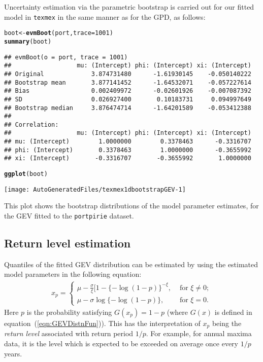 \documentclass[10pt]{article}\usepackage[]{graphicx}\usepackage[]{color}
\makeatletter
\def\maxwidth{ %
  \ifdim\Gin@nat@width>\linewidth
    \linewidth
  \else
    \Gin@nat@width
  \fi
}
\newcommand{\hlnum}[1]{\textcolor[rgb]{0.686,0.059,0.569}{#1}}%
\newcommand{\hlstd}[1]{\textcolor[rgb]{0.345,0.345,0.345}{#1}}%
\newcommand{\hlkwb}[1]{\textcolor[rgb]{0.69,0.353,0.396}{#1}}%
\newcommand{\hlkwc}[1]{\textcolor[rgb]{0.333,0.667,0.333}{#1}}%
\newcommand{\hlkwd}[1]{\textcolor[rgb]{0.737,0.353,0.396}{\textbf{#1}}}%
\newenvironment{kframe}{%
 \def\at@end@of@kframe{}%
 \ifinner\ifhmode%
  \def\at@end@of@kframe{\end{minipage}}%
  \begin{minipage}{\columnwidth}%
 \fi\fi%
 \def\FrameCommand##1{\hskip\@totalleftmargin \hskip-\fboxsep
 \colorbox{shadecolor}{##1}\hskip-\fboxsep
     \hskip-\linewidth \hskip-\@totalleftmargin \hskip\columnwidth}%
 \MakeFramed {\advance\hsize-\width
   \@totalleftmargin\z@ \linewidth\hsize
   \@setminipage}}%
 {\par\unskip\endMakeFramed%
 \at@end@of@kframe}
\newenvironment{knitrout}{}{} %
\makeatother
\begin{document}
Uncertainty estimation via the parametric bootstrap is carried out for our fitted model in {\tt texmex} in the same manner as for the GPD, as follows:
\begin{knitrout}
\color{fgcolor}\begin{kframe}
\begin{alltt}
\hlstd{boot} \hlkwb{<-} \hlkwd{evmBoot}\hlstd{(port,} \hlkwc{trace}\hlstd{=}\hlnum{1001}\hlstd{)}
\hlkwd{summary}\hlstd{(boot)}
\end{alltt}
\begin{verbatim}
## evmBoot(o = port, trace = 1001)
##                  mu: (Intercept) phi: (Intercept) xi: (Intercept)
## Original             3.874731480      -1.61930145    -0.050140222
## Bootstrap mean       3.877141452      -1.64532071    -0.057227614
## Bias                 0.002409972      -0.02601926    -0.007087392
## SD                   0.026927400       0.10183731     0.094997649
## Bootstrap median     3.876474714      -1.64201589    -0.053412388
## 
## Correlation:
##                  mu: (Intercept) phi: (Intercept) xi: (Intercept)
## mu: (Intercept)        1.0000000        0.3378463      -0.3316707
## phi: (Intercept)       0.3378463        1.0000000      -0.3655992
## xi: (Intercept)       -0.3316707       -0.3655992       1.0000000
\end{verbatim}
\begin{alltt}
\hlkwd{ggplot}\hlstd{(boot)}
\end{alltt}
\end{kframe}
\texttt{[image: AutoGeneratedFiles/texmex1dbootstrapGEV-1]} 

\end{knitrout}
This plot shows the bootstrap distributions of the model parameter estimates, for the GEV fitted to the {\tt portpirie} dataset.
%
\subsection{Return level estimation}
%
Quantiles of the fitted GEV distribution can be estimated by using the estimated model parameters in the following equation:
\begin{eqnarray}
x_p = \left\{
\begin{array}{ll}
  \mu - \frac{\sigma}{\xi}[1-\{-\log(1-p)\}^{-\xi}, & \mbox{ for }\xi\neq 0;\\
  \mu - \sigma\log\{-\log(1-p)\}, & \mbox{ for }\xi=0.
\end{array}
\right.
\label{eqn:GEVreturnLevel}
\end{eqnarray}
Here $p$ is the probability satisfying $G(x_p)=1-p$ (where $G(x)$ is defined in equation~(\ref{eqn:GEVDistnFun})).  This has the interpretation of $x_p$ being the {\it return level} associated with return period $1/p$. For example, for annual maxima data, it is the level which is expected to be exceeded on average once every $1/p$ years.
\end{document}
